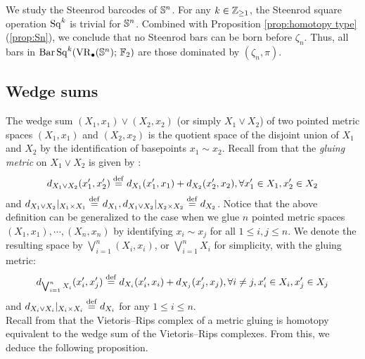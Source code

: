 We study the Steenrod barcodes of $\mathbb{S}^n$. For any $k\in \mathbb{Z}_{\geq 1}$, the Steenrod square operation $\operatorname{Sq}^k$ is trivial for $\mathbb{S}^n$. Combined with Proposition \ref{prop:homotopy type} (\ref{prop:Sn}), we conclude that no Steenrod bars can be born before $\zeta_n$. Thus, all bars in $\operatorname{Bar}\operatorname{Sq}^{k}(\operatorname{VR}_\bullet(\mathbb{S}^n);\,{\mathbb{F}_2})$ are those dominated by  $(\zeta_n,\pi)$.

\subsection{Wedge sums}

The wedge sum $(X_1,x_1)\vee (X_2,x_2)$ (or simply $X_1\vee X_2$) of two pointed metric spaces $(X_1,x_1)$ and $(X_2,x_2)$ is the quotient space of the disjoint union of $X_1$ and $X_2$ by the identification of basepoints $x_1\sim x_2$.
Recall from \cite{burago2001course} that the \emph{gluing metric} on $X_1\vee X_2$ is given by \label{para:gluing}: %
$$d_{X_1\vee X_2}(x_1',x_2')\stackrel{\mathrm{def}}{=} d_{X_1}(x_1',x_1)+d_{X_2}(x_2',x_2),\forall x_1'\in X_1, x_2'\in X_2$$
and $d_{X_1\vee X_2}\vert_{X_1\times X_1}\stackrel{\mathrm{def}}{=} d_{X_1},d_{X_1\vee X_2}\vert_{X_2\times X_2}\stackrel{\mathrm{def}}{=} d_{X_2}$. Notice that the above definition can be generalized to the case when we glue $n$ pointed metric spaces $(X_1,x_1),\cdots,(X_n,x_n)$ by identifying $x_i\sim x_j$ for all $1\leq i,j\leq n$. We denote the resulting space by $\bigvee_{i=1}^n (X_i,x_i)$, or $\bigvee_{i=1}^n X_i$ for simplicity, with the gluing metric:
$$d_{\bigvee_{i=1}^n X_i}(x_i',x_j')\stackrel{\mathrm{def}}{=} d_{X_i}(x_i',x_i)+d_{X_j}(x_j',x_j),\forall i\neq j, x_i'\in X_i, x_j'\in X_j$$
and $d_{X_i\vee X_i}|_{X_i\times X_i}\stackrel{\mathrm{def}}{=} d_{X_i}$ for any $1\leq i\leq n$.\\


Recall from \cite[Proposition 3.7]{adamaszek2020homotopy} that the Vietoris--Rips complex of a metric gluing is homotopy equivalent to the wedge sum of the Vietoris--Rips complexes. From this, we deduce the following proposition. 

